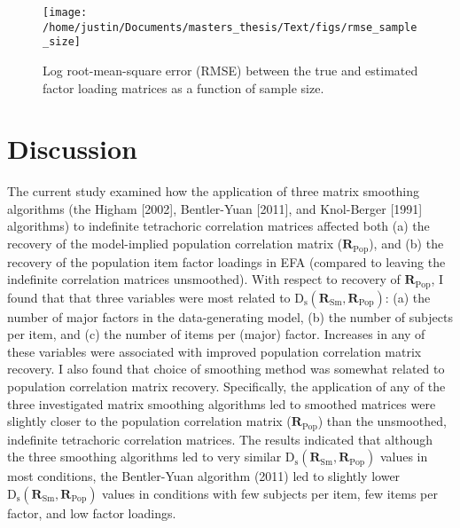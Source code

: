 \documentclass[
  english,
  man]{apa6}
\begin{document}
\begin{figure}

{\centering \texttt{[image: /home/justin/Documents/masters\_thesis/Text/figs/rmse\_sample\_size]} 

}

\caption{Log root-mean-square error (RMSE) between the true and estimated factor loading matrices as a function of sample size.}\label{fig:RMSE-sample-size}
\end{figure}

\hypertarget{discussion}{%
\section{Discussion}\label{discussion}}

The current study examined how the application of three matrix smoothing algorithms (the Higham {[}2002{]}, Bentler-Yuan {[}2011{]}, and Knol-Berger {[}1991{]} algorithms) to indefinite tetrachoric correlation matrices affected both (a) the recovery of the model-implied population correlation matrix (\(\mathbf{R}_{\textrm{Pop}}\)), and (b) the recovery of the population item factor loadings in EFA (compared to leaving the indefinite correlation matrices unsmoothed). With respect to recovery of \(\mathbf{R}_{\textrm{Pop}}\), I found that that three variables were most related to \(\mathrm{D}_{\mathrm{s}}(\mathbf{R}_{\textrm{Sm}}, \mathbf{R}_{\textrm{Pop}})\): (a) the number of major factors in the data-generating model, (b) the number of subjects per item, and (c) the number of items per (major) factor. Increases in any of these variables were associated with improved population correlation matrix recovery. I also found that choice of smoothing method was somewhat related to population correlation matrix recovery. Specifically, the application of any of the three investigated matrix smoothing algorithms led to smoothed matrices were slightly closer to the population correlation matrix (\(\mathbf{R}_{\textrm{Pop}}\)) than the unsmoothed, indefinite tetrachoric correlation matrices. The results indicated that although the three smoothing algorithms led to very similar \(\mathrm{D}_{\mathrm{s}}(\mathbf{R}_{\textrm{Sm}}, \mathbf{R}_{\textrm{Pop}})\) values in most conditions, the Bentler-Yuan algorithm (2011) led to slightly lower \(\mathrm{D}_{\mathrm{s}}(\mathbf{R}_{\textrm{Sm}}, \mathbf{R}_{\textrm{Pop}})\) values in conditions with few subjects per item, few items per factor, and low factor loadings.
\end{document}
